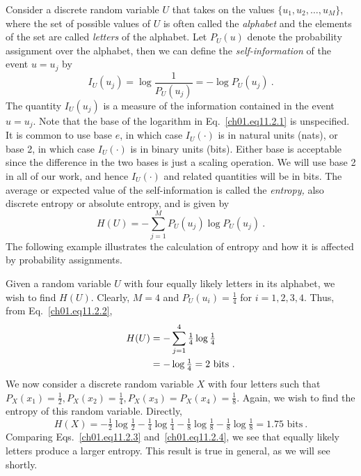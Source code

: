 Consider a discrete random variable $U$ that takes on
the values $\{u_1, u_2, \dots, u_M\}$, where the set of possible
values of $U$ is often called the \textit{alphabet} and the elements
of the set are called \textit{letters} of the alphabet. Let $P_U(u)$
denote the probability  assignment  over the alphabet, then we can
define the \textit{self-information} of the event $ u = u_j $ by
\begin{equation}
  I_U \left( u_j \right) = \log \frac{1}{P_U (u_j)} = - \log P_U
    \left( u_j \right)~.
\label{ch01.eq11.2.1}
\end{equation}
The quantity $I_U (u_j) $ is a measure  of the information  contained
in the event $ u = u_j$. Note that the base of the logarithm in
Eq.~\eqref{ch01.eq11.2.1} is unspecified. It is common
to use base $e$, in which case $I_U (\cdot) $ is in natural units (nats),
or base 2,  in which case $I_U(\cdot)$ is in binary units (bits).
Either base is acceptable since the difference in the two bases is just a
scaling operation. We will use base 2 in all of our work,
and hence $I_U(\cdot)$ and related quantities will be in bits.
The average or expected value of the self-information is called the
\textit{entropy,} also discrete entropy or absolute entropy, and is given by
\begin{equation}
 \displaystyle H(U) = - \sum^M_{j=1} P_U \left(u_j\right)
    \log P_U \left(u_j \right)~.
\label{ch01.eq11.2.2}
\end{equation}
The following example illustrates the calculation of entropy and how it is
affected by probability assignments.

\begin{example}
\label{ch01.ex11.2.1}
Given a random variable $U$ with four equally likely letters
in its alphabet, we wish to find $H(U)$. Clearly, $M=4$
and $P_U(u_i)= \tfrac{1}{4}$ for $ i = 1, 2, 3, 4 $. Thus, from
Eq.~\eqref{ch01.eq11.2.2},
\begin{align}
 H(U) \displaystyle & = - \sum^4_{j=1} \tfrac{1}{4} \log \tfrac{1}{4}
 \notag\\
 \displaystyle & = - \log \tfrac{1}{4} = 2 \textrm{ bits}~.
\label{ch01.eq11.2.3}
\end{align}
We now consider a discrete random  variable $X$ with four letters such that
$P_X (x_1) = \tfrac{1}{2},
 P_X (x_2) = \tfrac{1}{4},
 P_X (x_3) = P_X (x_4) = \tfrac{1}{8} $.
Again, we wish to find the entropy of this random variable. Directly,
\begin{equation}
 H(X)
 = -
 \tfrac{1}{2} \log
 \tfrac{1}{2} -
 \tfrac{1}{4} \log
 \tfrac{1}{4} -
 \tfrac{1}{8}
 \log
 \tfrac{1}{8} -
 \tfrac{1}{8}
 \log
 \tfrac{1}{8}
 = 1.75 \textrm{ bits}~.
\label{ch01.eq11.2.4}
\end{equation}
Comparing Eqs.~\eqref{ch01.eq11.2.3} and~\eqref{ch01.eq11.2.4}, we see
that equally likely letters produce a larger entropy.
This result is true in general, as we will see shortly.
\end{example}

